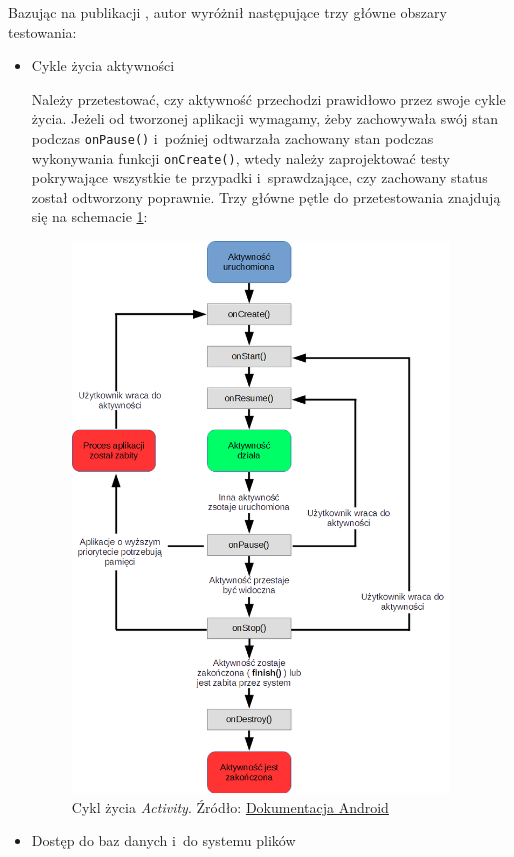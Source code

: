 Bazując na publikacji \cite{bib:android:testing:learning}, autor wyróżnił następujące trzy główne obszary testowania:

\begin{itemize}
\item{Cykle życia aktywności}

Należy przetestować, czy aktywność przechodzi prawidłowo przez swoje cykle życia. Jeżeli od tworzonej aplikacji wymagamy, żeby zachowywała swój stan podczas \texttt{onPause()} i~poźniej odtwarzała zachowany stan podczas wykonywania funkcji \texttt{onCreate()}, wtedy należy zaprojektować testy pokrywające wszystkie te przypadki i~sprawdzające, czy zachowany status został odtworzony poprawnie. Trzy główne pętle do przetestowania znajdują się na schemacie \ref{fig:sample_figure}:
\begin{figure}[!htb]
    \centering
    \includegraphics[width=10cm]{imgs/ch2_activity_lifecycle.png}
    \caption{Cykl życia \textit{Activity}. Źródło: \href{http://developer.android.com/reference/android/app/Activity.html}{Dokumentacja Android}}
    \label{fig:sample_figure}
\end{figure} 


\item{Dostęp do baz danych i~do systemu plików}


\end{itemize}
